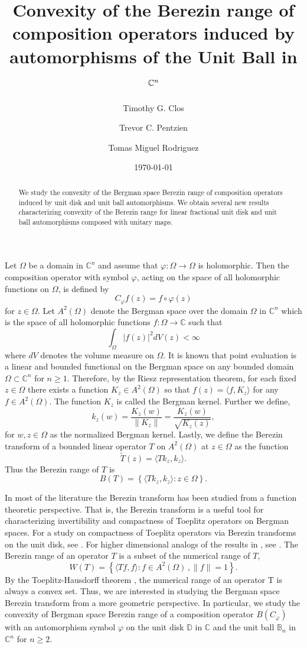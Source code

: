 \documentclass{amsart}
\title{Convexity of the Berezin range of composition operators induced by automorphisms of the Unit Ball in $\C^{n}$}
\author{Timothy G. Clos}
\author{Trevor C. Pentzien}
\author{Tomas Miguel Rodriguez}
\date{\today}
\theoremstyle{remark}
\newcommand{\C}{\mathbb{C}}
\newcommand{\D}{\Omega}
\begin{document}
\begin{abstract}
We study the convexity of the Bergman space Berezin range of composition operators induced by unit disk and unit ball automorphisms.  We obtain several new results characterizing convexity of the Berezin range for linear fractional unit disk and unit ball automorphisms composed with unitary maps. 
\end{abstract}

\maketitle

Let $\Omega$ be a domain in $\mathbb{C}^n$ and assume that $\varphi: \Omega \rightarrow \Omega$ is holomorphic. Then the composition operator with symbol $\varphi$, acting on the space of all holomorphic functions on $\Omega$, is defined by 
\[C_{\varphi}f(z)=f \circ\varphi(z)\]
for $z \in \Omega$. Let $A^{2}(\Omega)$  denote the Bergman space over the domain $\Omega$ in $\C^{n}$ which is the space of all holomorphic functions $f: \Omega \rightarrow \mathbb{C}$ such that 
\[\int_{\Omega}|f(z)|^2dV(z)< \infty\]
where $dV$ denotes the volume measure on $\Omega$.  It is known that point evaluation is a linear and bounded functional on the Bergman space on any bounded domain $\Omega \subset \mathbb{C}^n$ for $n \geq 1$. Therefore, by the Riesz representation theorem, for each fixed $z \in \Omega$ there exists a function $K_z \in A^2(\Omega)$ so that $f(z)=\langle f,K_z \rangle$ for any $f \in A^2(\Omega)$.  The function $K_z$ is called the Bergman kernel. Further we define, 
\[k_z(w)=\dfrac{K_z(w)}{\| K_z\|}=\dfrac{K_z(w)}{\sqrt{K_z(z)}},\]
for $w,z \in \Omega$  as the normalized Bergman kernel. Lastly, we define the Berezin transform of a bounded linear operator $T$ on $A^2(\Omega)$ at $z \in \D$  as the function
\[\widetilde{T}(z)= \langle Tk_z,k_z \rangle.\]
Thus the Berezin range of $T$ is 
\[B(T)=\left\{\langle Tk_z,k_z \rangle: z \in \Omega\right\}.\]

In most of the literature the Berezin transform has been studied from a function theoretic perspective. That is, the Berezin transform is a useful tool for characterizing invertibility and compactness of Toeplitz operators on Bergman spaces.  For a study on compactness of Toeplitz operators via Berezin transforms on the unit disk, see \cite{AxlerZheng}.  For higher dimensional analogs of the results in \cite{AxlerZheng}, see \cite{Coburn73, Eng99, CSZ, DS25}.
The Berezin range of an operator $T$ is a subset of the numerical range of $T$, 
\[W(T)=\left\{\langle Tf,f \rangle: f\in A^2(\Omega)\,,\|f\| =1\right\}.\]
By the Toeplitz-Hausdorff theorem \cite{T1918,H1919}, the numerical range of an operator T is always a convex set. Thus, we are interested in studying the Bergman space Berezin transform from a more geometric perspective.  In particular, we study the convexity of Bergman space Berezin range of a composition operator $B(C_{\varphi})$ with an automorphism symbol $\varphi$ on the unit disk $\mathbb{D}$ in $\mathbb{C}$ and the unit ball $\mathbb{B}_n$ in $\mathbb{C}^n$ for $n\geq 2$.
\end{document}
